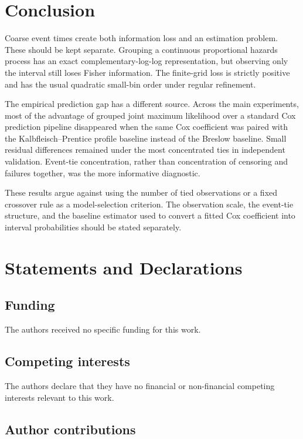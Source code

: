 \documentclass[smallextended,natbib]{svjour3}
\begin{document}
\FloatBarrier
\section{Conclusion}
\label{sec:conclusion}

Coarse event times create both information loss and an estimation problem. These should be kept separate. Grouping a continuous proportional hazards process has an exact complementary-log-log representation, but observing only the interval still loses Fisher information. The finite-grid loss is strictly positive and has the usual quadratic small-bin order under regular refinement.

The empirical prediction gap has a different source. Across the main experiments, most of the advantage of grouped joint maximum likelihood over a standard Cox prediction pipeline disappeared when the same Cox coefficient was paired with the Kalbfleisch--Prentice profile baseline instead of the Breslow baseline. Small residual differences remained under the most concentrated ties in independent validation. Event-tie concentration, rather than concentration of censoring and failures together, was the more informative diagnostic.

These results argue against using the number of tied observations or a fixed crossover rule as a model-selection criterion. The observation scale, the event-tie structure, and the baseline estimator used to convert a fitted Cox coefficient into interval probabilities should be stated separately.

\section*{Statements and Declarations}

\subsection*{Funding}

The authors received no specific funding for this work.

\subsection*{Competing interests}

The authors declare that they have no financial or non-financial competing interests relevant to this work.

\subsection*{Author contributions}
\end{document}
